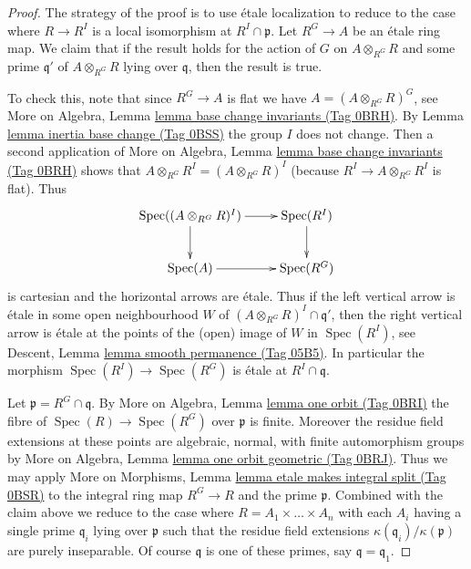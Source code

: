 \documentclass{amsart}
\theoremstyle{plain}
\theoremstyle{definition}
\theoremstyle{remark}
\numberwithin{equation}{subsection}
\def\Spec{\mathop{\mathrm{Spec}}}
\begin{document}
\begin{proof}
The strategy of the proof is to use \'etale localization to
reduce to the case where $R \to R^I$ is a local isomorphism at
$R^I \cap \mathfrak p$.
Let $R^G \to A$ be an \'etale ring map. We claim that if the result
holds for the action of $G$ on $A \otimes_{R^G} R$ and some prime
$\mathfrak q'$ of $A \otimes_{R^G} R$ lying over $\mathfrak q$, then
the result is true.

\medskip\noindent
To check this, note that since $R^G \to A$ is flat we have
$A = (A \otimes_{R^G} R)^G$, see More on Algebra,
Lemma \href{https://stacks.math.columbia.edu/tag/0BRH}{lemma base change invariants (Tag 0BRH)}.
By Lemma \href{https://stacks.math.columbia.edu/tag/0BSS}{lemma inertia base change (Tag 0BSS)} the group $I$ does not change.
Then a second application of More on Algebra,
Lemma \href{https://stacks.math.columbia.edu/tag/0BRH}{lemma base change invariants (Tag 0BRH)}
shows that $A \otimes_{R^G} R^I = (A \otimes_{R^G} R)^I$
(because $R^I \to A \otimes_{R^G} R^I$ is flat).
Thus
$$
\xymatrix{
\Spec((A \otimes_{R^G} R)^I) \ar[d] \ar[r] & \Spec(R^I) \ar[d] \\
\Spec(A) \ar[r] & \Spec(R^G)
}
$$
is cartesian and the horizontal arrows are \'etale. Thus if the
left vertical arrow is \'etale in some open neighbourhood $W$ of
$(A \otimes_{R^G} R)^I \cap \mathfrak q'$, then the right vertical
arrow is \'etale at the points of the (open) image of $W$ in
$\Spec(R^I)$, see
Descent, Lemma \href{https://stacks.math.columbia.edu/tag/05B5}{lemma smooth permanence (Tag 05B5)}. In particular
the morphism $\Spec(R^I) \to \Spec(R^G)$ is \'etale at $R^I \cap \mathfrak q$.

\medskip\noindent
Let $\mathfrak p = R^G \cap \mathfrak q$.
By More on Algebra, Lemma \href{https://stacks.math.columbia.edu/tag/0BRI}{lemma one orbit (Tag 0BRI)}
the fibre of $\Spec(R) \to \Spec(R^G)$ over $\mathfrak p$ is
finite. Moreover the residue field extensions at these points
are algebraic, normal, with finite automorphism groups by
More on Algebra, Lemma \href{https://stacks.math.columbia.edu/tag/0BRJ}{lemma one orbit geometric (Tag 0BRJ)}.
Thus we may apply
More on Morphisms,
Lemma \href{https://stacks.math.columbia.edu/tag/0BSR}{lemma etale makes integral split (Tag 0BSR)}
to the integral ring map $R^G \to R$ and the prime $\mathfrak p$.
Combined with the claim above we reduce to the case where
$R = A_1 \times \ldots \times A_n$ with each $A_i$ having a single
prime $\mathfrak q_i$ lying over $\mathfrak p$ such that the
residue field extensions $\kappa(\mathfrak q_i)/\kappa(\mathfrak p)$
are purely inseparable. Of course $\mathfrak q$ is one of
these primes, say $\mathfrak q = \mathfrak q_1$.


\end{proof}
\end{document}
